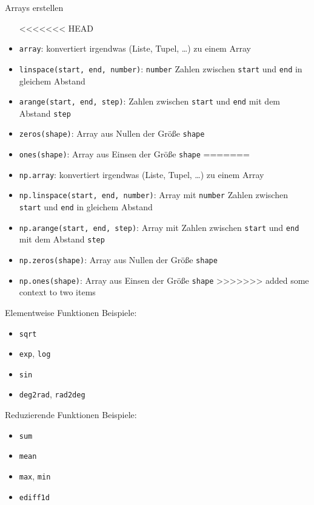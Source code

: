 \begin{frame}{Arrays erstellen}
  \begin{itemize}
<<<<<<< HEAD
    \item \texttt{array}: konvertiert irgendwas (Liste, Tupel, …) zu einem Array
    \item \texttt{linspace(start, end, number)}: \texttt{number} Zahlen zwischen \texttt{start} und \texttt{end} in gleichem Abstand
    \item \texttt{arange(start, end, step)}: Zahlen zwischen \texttt{start} und \texttt{end} mit dem Abstand \texttt{step}
    \item \texttt{zeros(shape)}: Array aus Nullen der Größe \texttt{shape}
    \item \texttt{ones(shape)}: Array aus Einsen der Größe \texttt{shape}
=======
    \item \texttt{np.array}: konvertiert irgendwas (Liste, Tupel, …) zu einem Array
    \item \texttt{np.linspace(start, end, number)}: Array mit \texttt{number} Zahlen zwischen \texttt{start} und \texttt{end} in gleichem Abstand
    \item \texttt{np.arange(start, end, step)}: Array mit Zahlen zwischen \texttt{start} und \texttt{end} mit dem Abstand \texttt{step}
    \item \texttt{np.zeros(shape)}: Array aus Nullen der Größe \texttt{shape}
    \item \texttt{np.ones(shape)}: Array aus Einsen der Größe \texttt{shape}
>>>>>>> added some context to two items
  \end{itemize}
\end{frame}

\begin{frame}{Elementweise Funktionen}
  Beispiele:
  \begin{itemize}
    \item \texttt{sqrt}
    \item \texttt{exp}, \texttt{log}
    \item \texttt{sin}
    \item \texttt{deg2rad}, \texttt{rad2deg}
  \end{itemize}
\end{frame}

\begin{frame}{Reduzierende Funktionen}
  Beispiele:
  \begin{itemize}
    \item \texttt{sum}
    \item \texttt{mean}
    \item \texttt{max}, \texttt{min}
    \item \texttt{ediff1d}
  \end{itemize}
\end{frame}

